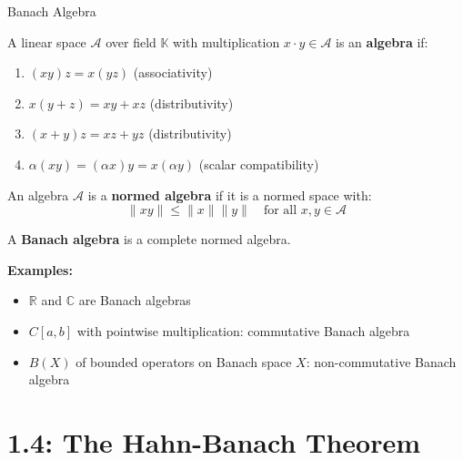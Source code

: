 \documentclass[aspectratio=169,10pt]{beamer}
\begin{document}
\begin{frame}{Banach Algebra}
  \begin{definition}
    A linear space $\mathcal{A}$ over field $\mathbb{K}$ with multiplication $x \cdot y \in \mathcal{A}$ is an \textbf{algebra} if:
    \begin{enumerate}
      \item $(xy)z = x(yz)$ (associativity)
      \item $x(y + z) = xy + xz$ (distributivity)
      \item $(x + y)z = xz + yz$ (distributivity)
      \item $\alpha(xy) = (\alpha x)y = x(\alpha y)$ (scalar compatibility)
    \end{enumerate}
  \end{definition}

  \vspace{0.3cm}
  \begin{definition}
    An algebra $\mathcal{A}$ is a \textbf{normed algebra} if it is a normed space with:
    $$\|xy\| \leq \|x\| \|y\| \quad \text{for all } x, y \in \mathcal{A}$$

    A \textbf{Banach algebra} is a complete normed algebra.
  \end{definition}

  \vspace{0.3cm}
  \textbf{Examples:}
  \begin{itemize}
    \item $\mathbb{R}$ and $\mathbb{C}$ are Banach algebras
    \item $C[a,b]$ with pointwise multiplication: commutative Banach algebra
    \item $B(X)$ of bounded operators on Banach space $X$: non-commutative Banach algebra
  \end{itemize}
\end{frame}


\section{1.4: The Hahn-Banach Theorem}
\end{document}
